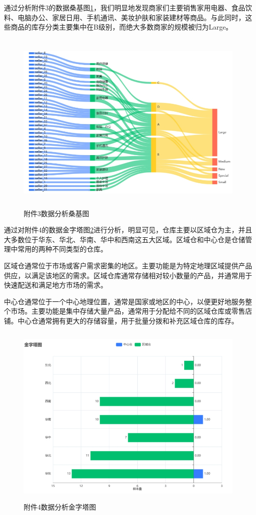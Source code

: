 \documentclass[withoutpreface,bwprint]{cumcmthesis}
\begin{document}
      通过分析附件3的数据桑基图\ref{附件3数据分析桑基图}，我们明显地发现商家们主要销售家用电器、食品饮料、电脑办公、家居日用、手机通讯、美妆护肤和家装建材等商品。与此同时，这些商品的库存分类主要集中在B级别，而绝大多数商家的规模被归为Large。
    \begin{figure}[htbp]
     \centering
     \includegraphics[width=15cm,height=9cm]{figure/附件3数据分析桑基图.png}%
     \caption{附件3数据分析桑基图}
     \label{附件3数据分析桑基图}
    \end{figure}

      通过对附件4的数据金字塔图\ref{附件4数据分析金字塔图}进行分析，明显可见，仓库主要以区域仓为主，并且大多数位于华东、华北、华南、华中和西南这五大区域。区域仓和中心仓是仓储管理中常用的两种不同类型的仓库。
      
      区域仓通常位于市场或客户需求密集的地区。主要功能是为特定地理区域提供产品供应，以满足该地区的需求。区域仓库通常存储相对较小数量的产品，并通常用于快速配送和满足地方市场的需求。
      
      中心仓通常位于一个中心地理位置，通常是国家或地区的中心，以便更好地服务整个市场。主要功能是集中存储大量产品，通常用于分配给不同的区域仓库或零售店铺。中心仓通常拥有更大的存储容量，用于批量分拨和补充区域仓库的库存。
    \begin{figure}[htbp]
     \centering
     \includegraphics[width=15cm,height=9cm]{figure/附件4数据分析金字塔图.png}%
     \caption{附件4数据分析金字塔图}
     \label{附件4数据分析金字塔图}
    \end{figure}
\end{document}

